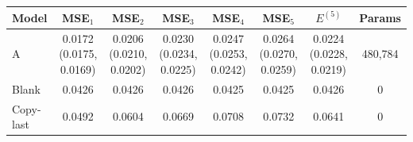 \begin{tabular}{lccccccc}
\toprule
Model & MSE$_1$ & MSE$_2$ & MSE$_3$ & MSE$_4$ & MSE$_5$ & $E^{(5)}$ & Params \\
\midrule
A & 0.0172 (0.0175, 0.0169) & 0.0206 (0.0210, 0.0202) & 0.0230 (0.0234, 0.0225) & 0.0247 (0.0253, 0.0242) & 0.0264 (0.0270, 0.0259) & 0.0224 (0.0228, 0.0219) & 480,784 \\
Blank & 0.0426 & 0.0426 & 0.0426 & 0.0425 & 0.0425 & 0.0426 & 0 \\
Copy-last & 0.0492 & 0.0604 & 0.0669 & 0.0708 & 0.0732 & 0.0641 & 0 \\
\bottomrule
\end{tabular}
